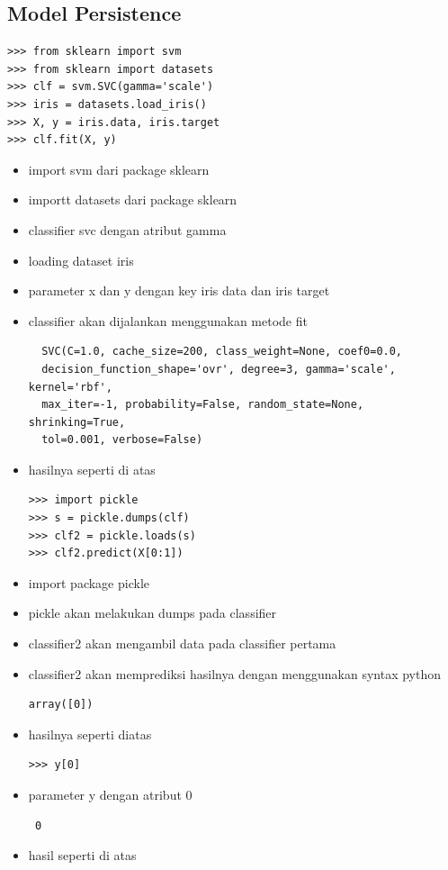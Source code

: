\subsection{Model Persistence}
\begin{verbatim}
>>> from sklearn import svm
>>> from sklearn import datasets
>>> clf = svm.SVC(gamma='scale')
>>> iris = datasets.load_iris()
>>> X, y = iris.data, iris.target
>>> clf.fit(X, y)
\end{verbatim}
\begin{itemize}
\item import svm dari package sklearn
\item importt datasets dari package sklearn
\item classifier svc dengan atribut gamma
\item loading dataset iris
\item parameter x dan y dengan key iris data dan iris target
\item classifier akan dijalankan menggunakan metode fit
\begin{verbatim}
  SVC(C=1.0, cache_size=200, class_weight=None, coef0=0.0,
  decision_function_shape='ovr', degree=3, gamma='scale', kernel='rbf',
  max_iter=-1, probability=False, random_state=None, shrinking=True,
  tol=0.001, verbose=False)
\end{verbatim}
\item hasilnya seperti di atas
\begin{verbatim}
>>> import pickle
>>> s = pickle.dumps(clf)
>>> clf2 = pickle.loads(s)
>>> clf2.predict(X[0:1])
\end{verbatim}
\item import package pickle
\item pickle akan melakukan dumps pada classifier
\item classifier2 akan mengambil data pada classifier pertama
\item classifier2 akan memprediksi hasilnya dengan menggunakan syntax python
\begin{verbatim}
array([0])
\end{verbatim}
\item hasilnya seperti diatas
\begin{verbatim}
>>> y[0]
\end{verbatim}
\item parameter y dengan atribut 0
\begin{verbatim}
 0
\end{verbatim}
\item hasil seperti di atas
\end{itemize}

